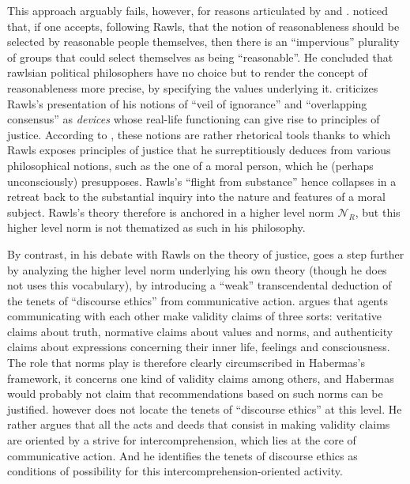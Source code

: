 \documentclass[preprint, french, english, 11pt, authoryear]{elsarticle}%
\begin{document}
This approach arguably fails, however, for reasons articulated by \citeauthor{habermas_reconciliation_1995} and \citeauthor{estlund_democratic_2009}. 
\citet{estlund_democratic_2009} noticed that, if one accepts, following Rawls, that the notion of reasonableness should be selected by reasonable people themselves, then there is an “impervious” plurality of groups that could select themselves as being “reasonable”. 
He concluded that rawlsian political philosophers have no choice but to render the concept of reasonableness more precise, by specifying the values underlying it. 
\cite{habermas_reconciliation_1995} criticizes Rawls's presentation of his notions of “veil of ignorance” and  “overlapping consensus” as \emph{devices} whose real-life functioning can give rise to principles of justice. 
According to \cite{habermas_reconciliation_1995}, these notions are rather rhetorical tools thanks to which Rawls exposes principles of justice that he surreptitiously deduces from various philosophical notions, such as the one of a moral person, which he (perhaps unconsciously) presupposes. 
Rawls's ``flight from substance'' hence collapses in a retreat back to the substantial inquiry into the nature and features of a moral subject.  Rawls's theory therefore is anchored in a higher level norm $\mathscr{N}_R$, but this higher level norm is not thematized as such in his philosophy.

By contrast, in his debate with Rawls on the theory of justice, \citet{habermas_moralbewustsein_1983} goes a step further by analyzing the higher level norm underlying his own theory (though he does not uses this vocabulary),
by introducing a “weak” transcendental deduction of the tenets of “discourse ethics” from communicative action. 
\citet{habermas_theorie_1981} argues that agents communicating with each other make validity claims of three sorts: veritative claims about truth, normative claims about values and norms, and authenticity claims about expressions concerning their inner life, feelings and consciousness. 
The role that norms play is therefore clearly circumscribed in Habermas's framework, it concerns one kind of validity claims among others, and Habermas would probably not claim that recommendations based on such norms can be justified. 
\cite{habermas_moralbewustsein_1983} however does not locate the tenets of “discourse ethics” at this level. 
He rather argues that all the acts and deeds that consist in making validity claims are oriented by a strive for intercomprehension, which lies at the core of communicative action. And he identifies the tenets of discourse ethics as conditions of possibility for this intercomprehension-oriented activity. 
\end{document}
